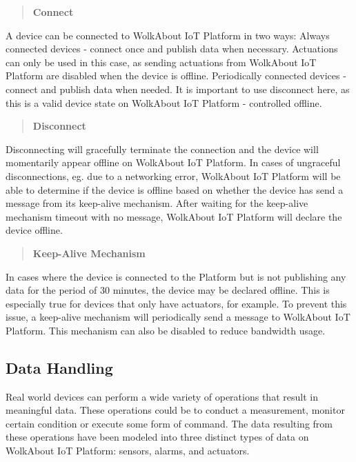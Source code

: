 \label{_connect}%
 \begin{quote}
{\bfseries Connect} \end{quote}


A device can be connected to Wolk\+About IoT Platform in two ways\+: Always connected devices -\/ connect once and publish data when necessary. Actuations can only be used in this case, as sending actuations from Wolk\+About IoT Platform are disabled when the device is offline. Periodically connected devices -\/ connect and publish data when needed. It is important to use disconnect here, as this is a valid device state on Wolk\+About IoT Platform -\/ controlled offline.

\label{_disconnect}%
 \begin{quote}
{\bfseries Disconnect} \end{quote}


Disconnecting will gracefully terminate the connection and the device will momentarily appear offline on Wolk\+About IoT Platform. In cases of ungraceful disconnections, eg. due to a networking error, Wolk\+About IoT Platform will be able to determine if the device is offline based on whether the device has send a message from its keep-\/alive mechanism. After waiting for the keep-\/alive mechanism timeout with no message, Wolk\+About IoT Platform will declare the device offline.

\label{_keep-alive-mechanism}%
 \begin{quote}
{\bfseries Keep-\/\+Alive Mechanism} \end{quote}


In cases where the device is connected to the Platform but is not publishing any data for the period of 30 minutes, the device may be declared offline. This is especially true for devices that only have actuators, for example. To prevent this issue, a keep-\/alive mechanism will periodically send a message to Wolk\+About IoT Platform. This mechanism can also be disabled to reduce bandwidth usage.

\label{_data-handling}%
 \subsection*{Data Handling}



 

Real world devices can perform a wide variety of operations that result in meaningful data. These operations could be to conduct a measurement, monitor certain condition or execute some form of command. The data resulting from these operations have been modeled into three distinct types of data on Wolk\+About IoT Platform\+: sensors, alarms, and actuators.

